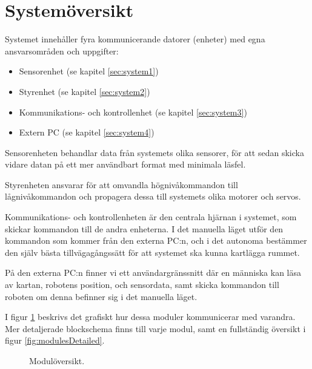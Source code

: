 \documentclass[a4paper,11pt]{article}
\begin{document}
\section{Systemöversikt}
Systemet innehåller fyra kommunicerande datorer (enheter) med egna ansvarsområden och uppgifter:
\begin{itemize}
\item Sensorenhet (se kapitel \ref{sec:system1})
\item Styrenhet (se kapitel \ref{sec:system2})
\item Kommunikations- och kontrollenhet (se kapitel \ref{sec:system3})
\item Extern PC (se kapitel \ref{sec:system4})
\end{itemize}

Sensorenheten behandlar data från systemets olika sensorer, för att sedan skicka vidare datan på ett mer användbart format med minimala läsfel.

Styrenheten ansvarar för att omvandla högnivåkommandon till lågnivåkommandon och propagera dessa till systemets olika motorer och servos.

Kommunikations- och kontrollenheten är den centrala hjärnan i systemet, som skickar kommandon till de andra enheterna. I det manuella läget utför den kommandon som kommer från den externa PC:n, och i det autonoma bestämmer den själv bästa tillvägagångssätt för att systemet ska kunna kartlägga rummet.

På den externa PC:n finner vi ett användargränssnitt där en människa kan läsa av kartan, robotens position, och sensordata, samt skicka kommandon till roboten om denna befinner sig i det manuella läget.

I figur \ref{fig:modules} beskrivs det grafiskt hur dessa moduler kommunicerar med varandra. Mer detaljerade blockschema finns till varje modul, samt en fullständig översikt i figur \ref{fig:modulesDetailed}.

\begin{figure}[h!]
    \caption{Modulöversikt.}
    \label{fig:modules}
\end{figure}
\end{document}
